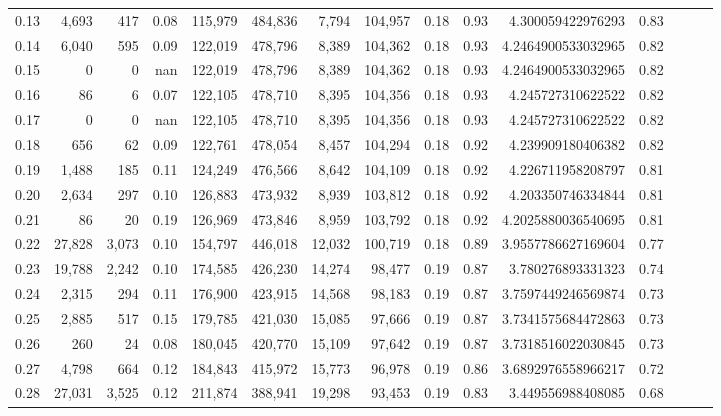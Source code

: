 \begin{tabular}{rrrrrrrrrrrrrrr}
0.13 &   4,693 &     417 &  0.08 &  115,979 &  484,836 &    7,794 &  104,957 &  0.18 &  0.93 &     4.300059422976293 &      0.83 \\
0.14 &   6,040 &     595 &  0.09 &  122,019 &  478,796 &    8,389 &  104,362 &  0.18 &  0.93 &    4.2464900533032965 &      0.82 \\
0.15 &       0 &       0 &   nan &  122,019 &  478,796 &    8,389 &  104,362 &  0.18 &  0.93 &    4.2464900533032965 &      0.82 \\
0.16 &      86 &       6 &  0.07 &  122,105 &  478,710 &    8,395 &  104,356 &  0.18 &  0.93 &     4.245727310622522 &      0.82 \\
0.17 &       0 &       0 &   nan &  122,105 &  478,710 &    8,395 &  104,356 &  0.18 &  0.93 &     4.245727310622522 &      0.82 \\
0.18 &     656 &      62 &  0.09 &  122,761 &  478,054 &    8,457 &  104,294 &  0.18 &  0.92 &     4.239909180406382 &      0.82 \\
0.19 &   1,488 &     185 &  0.11 &  124,249 &  476,566 &    8,642 &  104,109 &  0.18 &  0.92 &     4.226711958208797 &      0.81 \\
0.20 &   2,634 &     297 &  0.10 &  126,883 &  473,932 &    8,939 &  103,812 &  0.18 &  0.92 &     4.203350746334844 &      0.81 \\
0.21 &      86 &      20 &  0.19 &  126,969 &  473,846 &    8,959 &  103,792 &  0.18 &  0.92 &    4.2025880036540695 &      0.81 \\
0.22 &  27,828 &   3,073 &  0.10 &  154,797 &  446,018 &   12,032 &  100,719 &  0.18 &  0.89 &    3.9557786627169604 &      0.77 \\
0.23 &  19,788 &   2,242 &  0.10 &  174,585 &  426,230 &   14,274 &   98,477 &  0.19 &  0.87 &     3.780276893331323 &      0.74 \\
0.24 &   2,315 &     294 &  0.11 &  176,900 &  423,915 &   14,568 &   98,183 &  0.19 &  0.87 &    3.7597449246569874 &      0.73 \\
0.25 &   2,885 &     517 &  0.15 &  179,785 &  421,030 &   15,085 &   97,666 &  0.19 &  0.87 &    3.7341575684472863 &      0.73 \\
0.26 &     260 &      24 &  0.08 &  180,045 &  420,770 &   15,109 &   97,642 &  0.19 &  0.87 &    3.7318516022030845 &      0.73 \\
0.27 &   4,798 &     664 &  0.12 &  184,843 &  415,972 &   15,773 &   96,978 &  0.19 &  0.86 &    3.6892976558966217 &      0.72 \\
0.28 &  27,031 &   3,525 &  0.12 &  211,874 &  388,941 &   19,298 &   93,453 &  0.19 &  0.83 &     3.449556988408085 &      0.68 \\

\end{tabular}
